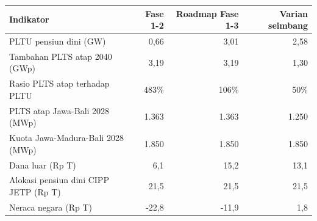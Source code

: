 \begin{tabular}{lrrr}
\toprule
Indikator & Fase 1-2 & Roadmap Fase 1-3 & Varian seimbang \\
\midrule
PLTU pensiun dini (GW) & 0,66 & 3,01 & 2,58 \\
Tambahan PLTS atap 2040 (GWp) & 3,19 & 3,19 & 1,30 \\
Rasio PLTS atap terhadap PLTU & 483\% & 106\% & 50\% \\
PLTS atap Jawa-Bali 2028 (MWp) & 1.363 & 1.363 & 1.250 \\
Kuota Jawa-Madura-Bali 2028 (MWp) & 1.850 & 1.850 & 1.850 \\
Dana luar (Rp T) & 6,1 & 15,2 & 13,1 \\
Alokasi pensiun dini CIPP JETP (Rp T) & 21,5 & 21,5 & 21,5 \\
Neraca negara (Rp T) & -22,8 & -11,9 & 1,8 \\
\bottomrule
\end{tabular}
